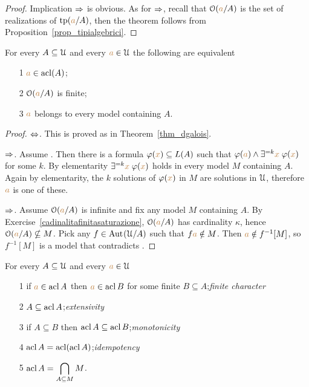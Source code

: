 \begin{proof} 
Implication $\Rightarrow$ is obvious. As for  $\Rightarrow$, recall that $\EuScript O({\color{brown} a}/A)$ is the set of realizations of ${\rm tp}({\color{brown} a}/A)$, then the theorem follows from Proposition~\ref{prop_tipialgebrici}.
\end{proof}


\begin{theorem}\label{thm_fmgalois}
For every $A\subseteq\EuScript U$ and every ${\color{brown} a}\in\EuScript U$ the following are equivalent
\begin{itemize}
\item[1] ${\color{brown} a}\in\mathop{\rm acl}(A)$;
\item[2] $\EuScript O({\color{brown} a}/A)$ is finite;
\item[3] ${\color{brown} a}$ belongs to every model containing $A$.
\end{itemize}
\end{theorem}

\begin{proof} $\Leftrightarrow$. This is proved as in Theorem~\ref{thm_dgalois}. 

$\Rightarrow$. Assume . Then there is a formula $\varphi({\color{brown} x})\subseteq L(A)$ such that $\varphi({\color{brown} a})\wedge\exists^{=k}{\color{brown} x}\;\varphi({\color{brown} x})$ for some $k$. By elementarity $\exists^{=k}{\color{brown} x}\;\varphi({\color{brown} x})$ holds in every model $M$ containing $A$. Again by elementarity, the $k$ solutions of $\varphi({\color{brown} x})$ in $M$ are solutions in $\EuScript U$, therefore ${\color{brown} a}$ is one of these.

$\Rightarrow$. Assume $\EuScript O({\color{brown} a}/A)$ is infinite and fix any model $M$ containing $A$. By Exercise~\ref{cadinalitafinitasaturazione}, $\EuScript O({\color{brown} a}/A)$  has cardinality $\kappa$, hence $\EuScript O({\color{brown} a}/A)\nsubseteq M$. Pick any $f\in\textrm{Aut\kern.15ex}(\EuScript U/A)$ such that $f{\color{brown} a}\notin M$. Then ${\color{brown} a}\notin f^{-1}[M]$, so $f^{-1}[M]$ is a model that contradicts .
\end{proof}




\begin{corollary}\label{fmacl123} 
For every $A\subseteq\EuScript U$ and every ${\color{brown} a}\in\EuScript U$
\begin{itemize}
\item[1]  if ${\color{brown} a}\in\mathop{\rm acl} A$ then ${\color{brown} a}\in\mathop{\rm acl} B$ for some finite $B\subseteq A$;\hfill\emph{finite character}
\item[2]  $A\subseteq \mathop{\rm acl} A$;\hfill\emph{extensivity}
\item[3]  if $A\subseteq B$ then $\mathop{\rm acl} A\subseteq \mathop{\rm acl} B$;\hfill\emph{monotonicity}
\item[4]  $\mathop{\rm acl} A=\mathop{\rm acl}(\mathop{\rm acl} A)$;\hfill\emph{idempotency}
\item[5]  $\displaystyle\mathop{\rm acl} A=\bigcap_{A\subseteq M}M$.
\end{itemize} 
\end{corollary}

